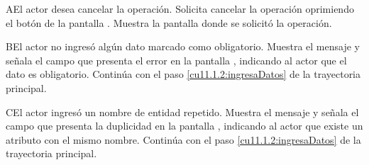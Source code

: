  \begin{UCtrayectoriaA}{A}{El actor desea cancelar la operación.}
    \UCpaso[\UCactor] Solicita cancelar la operación oprimiendo el botón  de la pantalla .
    \UCpaso[\UCsist] Muestra la pantalla donde se solicitó la operación.
 \end{UCtrayectoriaA}
 \begin{UCtrayectoriaA}{B}{El actor no ingresó algún dato marcado como obligatorio.}
    \UCpaso[\UCsist] Muestra el mensaje  y señala el campo que presenta el error en la pantalla 
	    , indicando al actor que el dato es obligatorio.
    \UCpaso[] Continúa con el paso \ref{cu11.1.2:ingresaDatos} de la trayectoria principal.
 \end{UCtrayectoriaA}
 \begin{UCtrayectoriaA}{C}{El actor ingresó un nombre de entidad repetido.}
    \UCpaso[\UCsist] Muestra el mensaje  y señala el campo que presenta la duplicidad en la pantalla 
	    , indicando al actor que existe un atributo con el mismo nombre.
    \UCpaso[] Continúa con el paso \ref{cu11.1.2:ingresaDatos} de la trayectoria principal.
 \end{UCtrayectoriaA}
 
